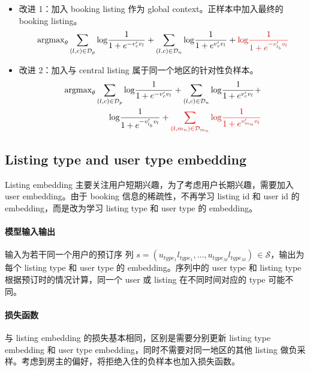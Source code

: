 \begin{itemize}
  \item 改进 1：加入 booking listing 作为 global context。正样本中加入最终的
    booking listing。
    \begin{equation}
      \mathrm{argmax}_{\theta} \sum_{(l, c) \in \mathcal{D}_{p}} \mathrm{log} \frac{1}{1 + e^{-v'_c v_l}} + \sum_{(l, c) \in \mathcal{D}_{n}} \mathrm{log} \frac{1}{1 + e^{v'_c v_l}} + {\color{red}{\mathrm{log} \frac{1}{1 + e^{-v'_{l_b}v_l}}}}
    \end{equation}
  \item 改进 2：加入与 central listing 属于同一个地区的针对性负样本。
    \begin{equation}
    \begin{split}
      \mathrm{argmax}_{\theta} \sum_{(l, c) \in \mathcal{D}_{p}} \mathrm{log} \frac{1}{1 + e^{-v'_c v_l}} + \sum_{(l, c) \in \mathcal{D}_{n}} \mathrm{log} \frac{1}{1 + e^{v'_c v_l}} + \\ {\mathrm{log} \frac{1}{1 + e^{-v'_{l_b}v_l}}} + {\color{red}{\sum_{(l, m_n) \in \mathcal{D}_{m_n}} \mathrm{log} \frac{1}{1 + e^{v'_{m_n} v_l}}}}
    \end{split}
  \end{equation}
\end{itemize} 

\subsection{Listing type and user type embedding}
Listing embedding 主要关注用户短期兴趣，为了考虑用户长期兴趣，需要加入 user
embedding。由于 booking 信息的稀疏性，不再学习 listing id 和 user
id 的 embedding，而是改为学习 listing type 和 user type 的 embedding。

\paragraph{模型输入输出} 输入为若干同一个用户的预订序
列 $s=(u_{type_1}l_{type_1}, \ldots, u_{type_M}l_{type_M}) \, \in \mathcal{S}$，输出为
每个 listing type 和 user type 的 embedding。序列中的 user type 和 listing type
根据预订时的情况计算，同一个 user 或 listing 在不同时间对应的 type 可能不同。

\paragraph{损失函数} 与 listing embedding 的损失基本相同，区别是需要分别更新
listing type embedding 和 user type embedding，同时不需要对同一地区的其他
listing 做负采样。考虑到房主的偏好，将拒绝入住的负样本也加入损失函数。

